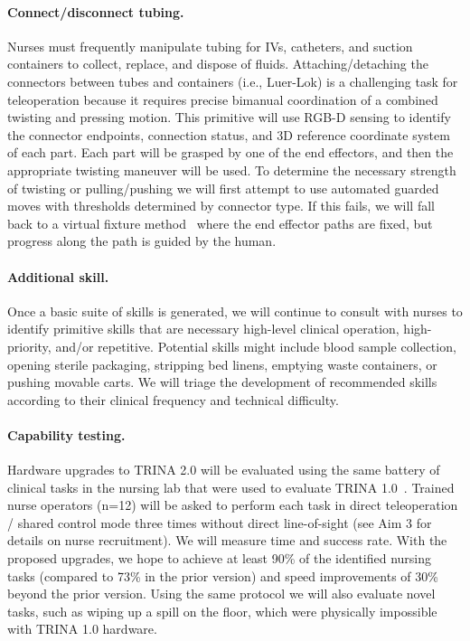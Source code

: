 \paragraph{Connect/disconnect tubing.} Nurses must frequently manipulate tubing for IVs, catheters, and suction containers to collect, replace, and dispose of fluids.  Attaching/detaching the connectors between tubes and containers (i.e., Luer-Lok) is a challenging task for teleoperation because it requires precise bimanual coordination of a combined twisting and pressing motion.  This primitive will use RGB-D sensing to identify the connector endpoints, connection status, and 3D reference coordinate system of each part.  Each part will be grasped by one of the end effectors, and then the appropriate twisting maneuver will be used.  To determine the necessary strength of twisting or pulling/pushing we will first attempt to use automated guarded moves with thresholds determined by connector type.  If this fails, we will fall back to a virtual fixture method~\cite{MOH2003} where the end effector paths are fixed, but progress along the path is guided by the human. 

\paragraph{Additional skill.} Once a basic suite of skills is generated, we will continue to consult with nurses to identify primitive skills that are necessary high-level clinical operation, high-priority, and/or repetitive.  Potential skills might include blood sample collection, opening sterile packaging, stripping bed linens, emptying waste containers, or pushing movable carts.  We will triage the development of recommended skills according to their clinical frequency and technical difficulty.

\paragraph{Capability testing.} Hardware upgrades to TRINA 2.0 will be evaluated using the same battery of clinical tasks in the nursing lab that were used to evaluate TRINA 1.0~\cite{LiTRINASystem2017}.  Trained nurse operators (n=12) will be asked to perform each task in direct teleoperation / shared control mode three times without direct line-of-sight (see Aim 3 for details on nurse recruitment). We will measure time and success rate. With the proposed upgrades, we hope to achieve at least 90\% of the identified nursing tasks (compared to 73\% in the prior version) and speed improvements of 30\% beyond the prior version.  Using the same protocol we will also evaluate novel tasks, such as wiping up a spill on the floor, which were physically impossible with TRINA 1.0 hardware.

